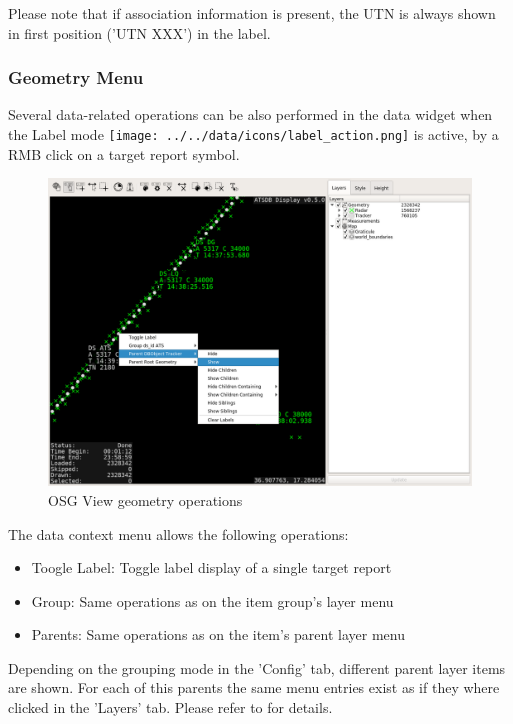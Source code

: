 Please note that if association information is present, the UTN is always shown in first position ('UTN XXX') in the label.

\subsubsection{Geometry Menu}

Several data-related operations can be also performed in the data widget when the Label mode \texttt{[image: ../../data/icons/label\_action.png]} is active, by a RMB click on a target report symbol.

\begin{figure}[H]
    \hspace*{-2.5cm}
    \includegraphics[width=19cm,frame]{figures/osgview_data_operations.png}
  \caption{OSG View geometry operations}
\end{figure}

The data context menu allows the following operations:

\begin{itemize}
 \item Toogle Label: Toggle label display of a single target report
 \item Group: Same operations as on the item group's layer menu
 \item Parents: Same operations as on the item's parent layer menu
\end{itemize}

Depending on the grouping mode in the 'Config' tab, different parent layer items are shown. For each of this parents the same menu entries exist as if they where clicked in the 'Layers' tab. Please refer to  for details.


